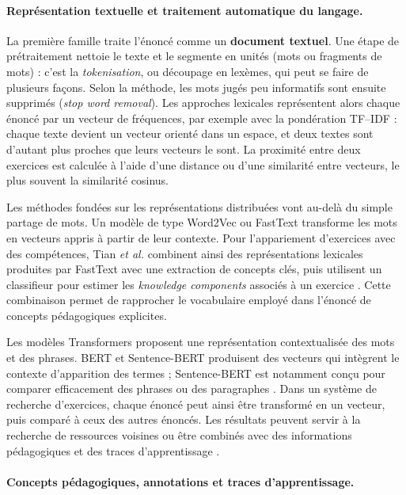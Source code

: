 \documentclass[12pt,a4paper,oneside]{report}
\begin{document}
\paragraph{Représentation textuelle et traitement automatique du langage.}

La première famille traite l'énoncé comme un \textbf{document textuel}.
Une étape de prétraitement nettoie le texte et le segmente en unités
(mots ou fragments de mots) : c'est la \emph{tokenisation}, ou découpage en
lexèmes, qui peut se faire de plusieurs façons. Selon la méthode, les mots
jugés peu informatifs sont ensuite supprimés (\emph{stop word removal}).
Les approches lexicales représentent alors chaque énoncé par un vecteur de
fréquences, par exemple avec la pondération TF--IDF : chaque texte devient
un vecteur orienté dans un espace, et deux textes sont d'autant plus proches
que leurs vecteurs le sont. La proximité entre deux exercices est calculée
à l'aide d'une distance ou d'une similarité entre vecteurs, le plus
souvent la similarité cosinus.

Les méthodes fondées sur les représentations distribuées vont au-delà du
simple partage de mots. Un modèle de type Word2Vec ou FastText transforme les
mots en vecteurs appris à partir de leur contexte. Pour l'appariement
d'exercices avec des compétences, Tian \emph{et al.} combinent ainsi des
représentations lexicales produites par FastText avec une extraction de
concepts clés, puis utilisent un classifieur pour estimer les
\emph{knowledge components} associés à un exercice
\cite{tian_2022}. Cette combinaison permet de rapprocher le vocabulaire
employé dans l'énoncé de concepts pédagogiques explicites.

Les modèles Transformers proposent une représentation contextualisée des
mots et des phrases. BERT et Sentence-BERT produisent des vecteurs qui
intègrent le contexte d'apparition des termes ; Sentence-BERT est notamment
conçu pour comparer efficacement des phrases ou des paragraphes
\cite{reimers_sentence-bert_2019}. Dans un système de recherche d'exercices, chaque énoncé
peut ainsi être transformé en un vecteur, puis comparé à ceux des
autres énoncés. Les résultats peuvent servir à la recherche de ressources
voisines ou être combinés avec des informations pédagogiques et des traces
d'apprentissage \cite{liu_2018,pelanek_2020}.

\paragraph{Concepts pédagogiques, annotations et traces d'apprentissage.}
\end{document}
